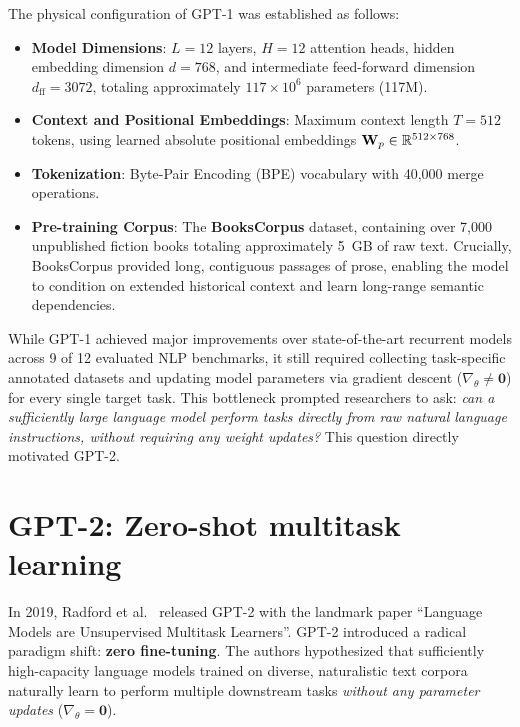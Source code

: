 \documentclass[../../main.tex]{subfiles}
\begin{document}
The physical configuration of GPT-1 was established as follows:
\begin{itemize}
    \item \textbf{Model Dimensions}: $L = 12$ layers, $H = 12$ attention heads, hidden embedding dimension $d = 768$, and intermediate feed-forward dimension $d_{\text{ff}} = 3072$, totaling approximately $117 \times 10^6$ parameters (117M).
    \item \textbf{Context and Positional Embeddings}: Maximum context length $T = 512$ tokens, using learned absolute positional embeddings $\mathbf{W}_p \in \mathbb{R}^{512 \times 768}$.
    \item \textbf{Tokenization}: Byte-Pair Encoding (BPE) vocabulary with 40,000 merge operations.
    \item \textbf{Pre-training Corpus}: The \textbf{BooksCorpus} dataset, containing over 7,000 unpublished fiction books totaling approximately 5~GB of raw text. Crucially, BooksCorpus provided long, contiguous passages of prose, enabling the model to condition on extended historical context and learn long-range semantic dependencies.
\end{itemize}

While GPT-1 achieved major improvements over state-of-the-art recurrent models across 9 of 12 evaluated NLP benchmarks, it still required collecting task-specific annotated datasets and updating model parameters via gradient descent ($\nabla_\theta \ne \mathbf{0}$) for every single target task. This bottleneck prompted researchers to ask: \emph{can a sufficiently large language model perform tasks directly from raw natural language instructions, without requiring any weight updates?} This question directly motivated GPT-2.

\clearpage
\section{GPT-2: Zero-shot multitask learning}
\label{sec:gpt2_architecture}

In 2019, Radford et al.~\cite{radford2019} released GPT-2 with the landmark paper ``Language Models are Unsupervised Multitask Learners''. GPT-2 introduced a radical paradigm shift: \textbf{zero fine-tuning}. The authors hypothesized that sufficiently high-capacity language models trained on diverse, naturalistic text corpora naturally learn to perform multiple downstream tasks \emph{without any parameter updates} ($\nabla_\theta = \mathbf{0}$).
\end{document}
